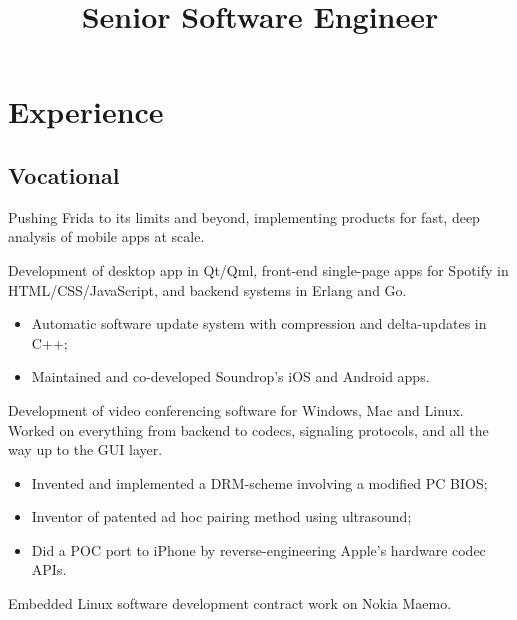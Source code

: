 \documentclass[11pt,a4paper,sans]{moderncv}
\title{Senior Software Engineer}
\begin{document}
\makecvtitle

\section{Experience}
\subsection{Vocational}
{Pushing Frida to its limits and beyond, implementing products for fast, deep
analysis of mobile apps at scale.}
{Development of desktop app in Qt/Qml, front-end single-page apps for Spotify
in HTML/CSS/JavaScript, and backend systems in Erlang and Go.
\begin{itemize}
\item Automatic software update system with compression and delta-updates in C++;
\item Maintained and co-developed Soundrop's iOS and Android apps.
\end{itemize}}
{Development of video conferencing software for Windows, Mac and Linux.
Worked on everything from backend to codecs, signaling protocols, and all the
way up to the GUI layer.
\begin{itemize}
\item Invented and implemented a DRM-scheme involving a modified PC BIOS;
\item Inventor of patented ad hoc pairing method using ultrasound;
\item Did a POC port to iPhone by reverse-engineering Apple's hardware codec APIs.
\end{itemize}}
{Embedded Linux software development contract work on Nokia Maemo.}
\end{document}
